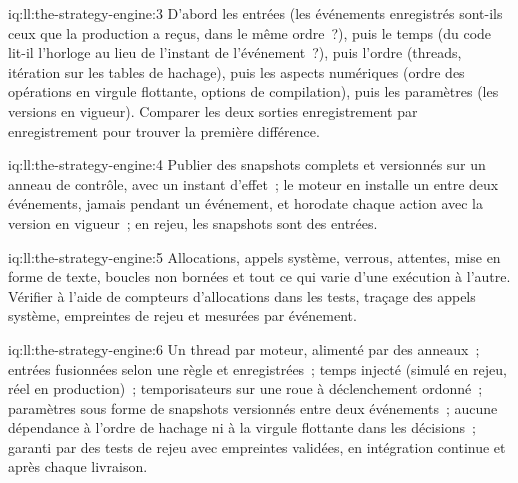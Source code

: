 \begin{solution}{iq:ll:the-strategy-engine:3}
D'abord les entrées (les événements enregistrés sont-ils ceux que la production a reçus, dans le même ordre~?), puis le temps (du code lit-il l'horloge
au lieu de l'instant de l'événement~?), puis l'ordre (threads, itération sur les tables de hachage), puis les aspects numériques (ordre des opérations en virgule flottante, options de compilation), puis
les paramètres (les versions en vigueur). Comparer les deux sorties enregistrement par enregistrement pour trouver la première différence.
\end{solution}

\begin{solution}{iq:ll:the-strategy-engine:4}
Publier des snapshots complets et versionnés sur un anneau de contrôle, avec un instant d'effet~; le moteur en installe un entre deux événements, jamais
pendant un événement, et horodate chaque action avec la version en vigueur~; en rejeu, les snapshots sont des entrées.
\end{solution}

\begin{solution}{iq:ll:the-strategy-engine:5}
Allocations, appels système, verrous, attentes, mise en forme de texte, boucles non bornées et tout ce qui varie d'une exécution à l'autre. Vérifier à l'aide de
compteurs d'allocations dans les tests, traçage des appels système, empreintes de rejeu et  mesurées par événement.
\end{solution}

\begin{solution}{iq:ll:the-strategy-engine:6}
Un thread par moteur, alimenté par des anneaux~; entrées fusionnées selon une règle et enregistrées~; temps injecté (simulé en rejeu, réel en production)~; temporisateurs
sur une roue à déclenchement ordonné~; paramètres sous forme de snapshots versionnés entre deux événements~; aucune dépendance à l'ordre de hachage ni à la virgule flottante
dans les décisions~; garanti par des tests de rejeu avec empreintes validées, en intégration continue et après chaque livraison.
\end{solution}
